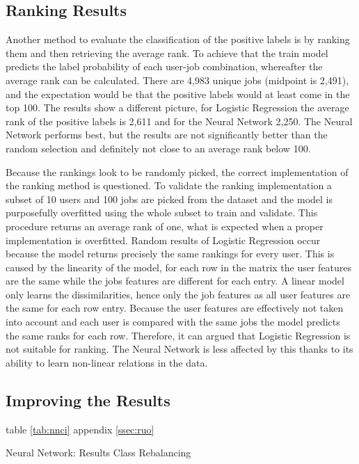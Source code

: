 \subsection{Ranking Results}
Another method to evaluate the classification of the positive labels is by ranking them and then retrieving the average rank.
To achieve that the train model predicts the label probability of each user-job combination, whereafter the average rank can be calculated.
There are 4,983 unique jobs (midpoint is 2,491), and the expectation would be that the positive labels would at least come in the top 100. 
The results show a different picture, for Logistic Regression the average rank of the positive labels is 2,611 and for the Neural Network 2,250.
The Neural Network performs best, but the results are not significantly better than the random selection and definitely not close to an average rank below 100.

Because the rankings look to be randomly picked, the correct implementation of the ranking method is questioned. 
To validate the ranking implementation a subset of 10 users and 100 jobs are picked from the dataset and the model is purposefully overfitted using the whole subset to train and validate.
This procedure returns an average rank of one, what is expected when a proper implementation is overfitted.
Random results of Logistic Regression occur because the model returns precisely the same rankings for every user.
This is caused by the linearity of the model, for each row in the matrix the user features are the same while the jobs features are different for each entry.
A linear model only learns the dissimilarities, hence only the job features as all user features are the same for each row entry. 
Because the user features are effectively not taken into account and each user is compared with the same jobs the model predicts the same ranks for each row.
Therefore, it can argued that Logistic Regression is not suitable for ranking.
The Neural Network is less affected by this thanks to its ability to learn non-linear relations in the data. 

\subsection{Improving the Results}

table \ref{tab:nnci}
appendix \ref{ssec:ruo}

\begin{table}[h]
\begin{footnotesize}

\end{footnotesize}
\caption{\footnotesize{\label{tab:nnci} Neural Network: Results Class Rebalancing}}
\end{table}

